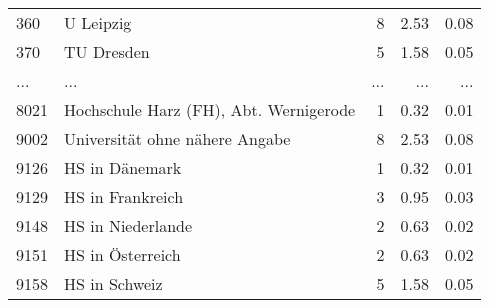 \begin{longtable}{lXrrr}
        360 & \multicolumn{1}{X}{U Leipzig} & %
          \num{8} &
          \num[round-mode=places,round-precision=2]{2,53} &
          \num[round-mode=places,round-precision=2]{0,08} \\
        370 & \multicolumn{1}{X}{TU Dresden} & %
          \num{5} &
          \num[round-mode=places,round-precision=2]{1,58} &
          \num[round-mode=places,round-precision=2]{0,05} \\
       ... & ... & ... & ... & ... \\
        8021 & \multicolumn{1}{X}{Hochschule Harz (FH), Abt. Wernigerode} & %
          \num{1} &
          \num[round-mode=places,round-precision=2]{0,32} &
          \num[round-mode=places,round-precision=2]{0,01} \\

        9002 & \multicolumn{1}{X}{Universität ohne nähere Angabe} & %
          \num{8} &
          \num[round-mode=places,round-precision=2]{2,53} &
          \num[round-mode=places,round-precision=2]{0,08} \\

        9126 & \multicolumn{1}{X}{HS in Dänemark} & %
          \num{1} &
          \num[round-mode=places,round-precision=2]{0,32} &
          \num[round-mode=places,round-precision=2]{0,01} \\

        9129 & \multicolumn{1}{X}{HS in Frankreich} & %
          \num{3} &
          \num[round-mode=places,round-precision=2]{0,95} &
          \num[round-mode=places,round-precision=2]{0,03} \\

        9148 & \multicolumn{1}{X}{HS in Niederlande} & %
          \num{2} &
          \num[round-mode=places,round-precision=2]{0,63} &
          \num[round-mode=places,round-precision=2]{0,02} \\

        9151 & \multicolumn{1}{X}{HS in Österreich} & %
          \num{2} &
          \num[round-mode=places,round-precision=2]{0,63} &
          \num[round-mode=places,round-precision=2]{0,02} \\

        9158 & \multicolumn{1}{X}{HS in Schweiz} & %
          \num{5} &
          \num[round-mode=places,round-precision=2]{1,58} &
          \num[round-mode=places,round-precision=2]{0,05} \\


\end{longtable}
